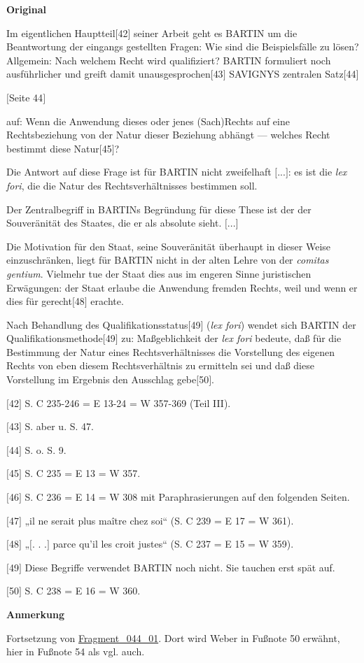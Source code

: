 \documentclass[ngerman,final,fontsize=12pt,paper=a4,twoside,bibliography=totocnumbered,BCOR=8mm,draft=false]{scrartcl}
\newenvironment{fragment}
	{\begin{snugshade}}
	{\end{snugshade}
	 \penalty-200
	 \vskip 0pt plus 10mm minus 5mm}
\newenvironment{fragmentpart}[1]
	{\noindent\textbf{#1}\par\penalty500}
	{\par}
\begin{document}
\begin{fragment}
\begin{fragmentpart}{Original \cite[S.~43--44 Z.~21--24,~1--4,~6--9,~21--30]{Weber-1986}}
{Im eigentlichen Hauptteil$[$42$]$ seiner Arbeit geht es BARTIN um die Beantwortung der eingangs gestellten Fragen: Wie sind die Beispielsfälle zu lösen? Allgemein: Nach welchem Recht wird qualifiziert? BARTIN formuliert noch ausführlicher und greift damit unausgesprochen$[$43$]$ SAVIGNYS zentralen Satz$[$44$]$ 

$[$Seite 44$]$ 

auf: Wenn die Anwendung dieses oder jenes (Sach)Rechts auf eine Rechtsbeziehung von der Natur dieser Beziehung abhängt --- welches Recht bestimmt diese Natur$[$45$]$?

Die Antwort auf diese Frage ist für BARTIN nicht zweifelhaft $[$...$]$: es
ist die \textsl{lex fori}, die die Natur des Rechtsverhältnisses bestimmen soll.

Der Zentralbegriff in BARTINs Begründung für diese These ist der der
Souveränität des Staates, die er als absolute sieht. $[$...$]$

Die Motivation für den Staat, seine Souveränität überhaupt in dieser Weise einzuschränken, liegt für BARTIN nicht in der alten Lehre von der \textsl{comitas gentium}. Vielmehr tue der Staat dies aus im engeren Sinne juristischen Erwägungen: der Staat erlaube die Anwendung fremden Rechts, weil und wenn er dies für gerecht$[$48$]$ erachte.

Nach Behandlung des Qualifikationsstatus$[$49$]$ (\textsl{lex fori}) wendet sich BARTIN der Qualifikationsmethode$[$49$]$ zu: Maßgeblichkeit der \textsl{lex fori} bedeute, daß für die Bestimmung der Natur eines Rechtsverhältnisses die Vorstellung des eigenen Rechts von eben diesem Rechtsverhältnis zu ermitteln sei und daß diese Vorstellung im Ergebnis den Ausschlag gebe$[$50$]$.

$[$42$]$ S. C 235-246 = E 13-24 = W 357-369 (Teil III).

$[$43$]$ S. aber u. S. 47.

$[$44$]$ S. o. S. 9.

$[$45$]$ S. C 235 = E 13 = W 357.

$[$46$]$ S. C 236 = E 14 = W 308 mit Paraphrasierungen auf den folgenden Seiten.

$[$47$]$ „il ne serait plus maître chez soi“ (S. C 239 = E 17 = W 361).

$[$48$]$ „$[$. . .$]$ parce qu’il les croit justes“ (S. C 237 = E 15 = W 359).

$[$49$]$ Diese Begriffe verwendet BARTIN noch nicht. Sie tauchen erst spät auf.

$[$50$]$ S. C 238 = E 16 = W 360.}
\end{fragmentpart}
\begin{fragmentpart}{Anmerkung}
Fortsetzung von \hyperlink{Lm-Fragment-044-01}{Fragment\_044\_01}. Dort wird Weber in Fußnote 50 erwähnt, hier in Fußnote 54 als \textquotedbl{}vgl. auch\textquotedbl{}.
\end{fragmentpart}
\end{fragment}
\end{document}
